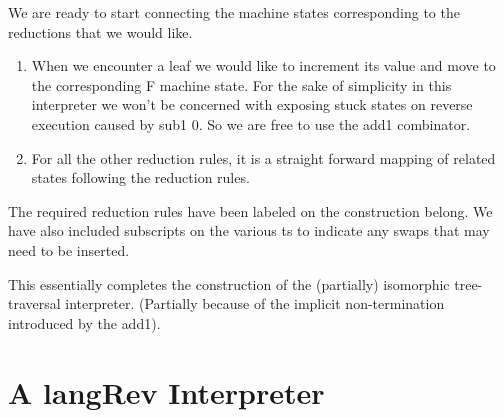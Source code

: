 \documentclass{llncs}
\begin{document}
We are ready to start connecting the machine states corresponding to
the reductions that we would like. 

\begin{enumerate}

\item 
When we encounter a leaf we would like to increment its value and move
to the corresponding {{F}} machine state. For the sake of simplicity
in this interpreter we won't be concerned with exposing stuck states
on reverse execution caused by {{sub1 0}}. So we are free to use the
{{add1}} combinator.

\item
For all the other reduction rules, it is a straight forward mapping of
related states following the reduction rules. 

\end{enumerate}

The required reduction rules have been labeled on the construction
belong. We have also included subscripts on the various {{t}}s to
indicate any swaps that may need to be inserted.

\begin{center}
\end{center}

This essentially completes the construction of the (partially)
isomorphic tree-traversal interpreter. (Partially because of the
implicit non-termination introduced by the {{add1}}).

\section{A {{langRev}} Interpreter}
\end{document}
